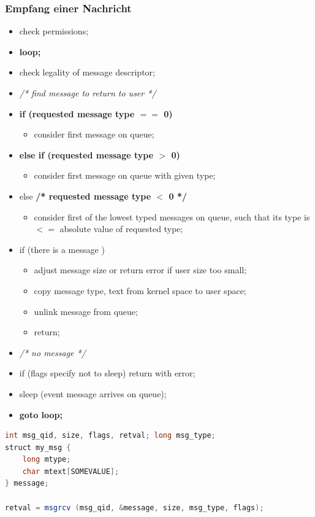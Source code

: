\documentclass[10pt]{article}
\begin{document}
\subsubsection{Empfang einer Nachricht}
\begin{itemize}
	\item check permissions;
	\item \textbf{loop;}
	\item check legality of message descriptor;
	\item \textit{/* find message to return to user */}
	\item \textbf{if (requested message type $==$ 0)}
		\begin{itemize}
			\item consider first message on queue;
		\end{itemize}
	\item \textbf{else if (requested message type $>$ 0)}
		\begin{itemize}
			\item consider first message on queue with given type;
		\end{itemize}
	\item else   \textbf{/* requested message type $<$ 0 */}
		\begin{itemize}
			\item consider first of the lowest typed messages on queue, such that its type is $<=$ absolute value of requested type;
		\end{itemize}
	\item if (there is a message )
		\begin{itemize}
			\item adjust message size or return error if user size too small;
			\item copy message type, text from kernel space to user space;
			\item unlink message from queue;
			\item return;
		\end{itemize}
	\item \textit{/* no message */}
	\item if (flags specify not to sleep) return with error;
	\item sleep (event message arrives on queue);
	\item \textbf{goto loop;}
\end{itemize}
\begin{lstlisting}[language=Java, caption=Empfangen einer Nachricht, style=JavaStyle]
int msg_qid, size, flags, retval; long msg_type;
struct my_msg { 
	long mtype;
	char mtext[SOMEVALUE];
} message;

retval = msgrcv (msg_qid, &message, size, msg_type, flags);
\end{lstlisting}
\end{document}

